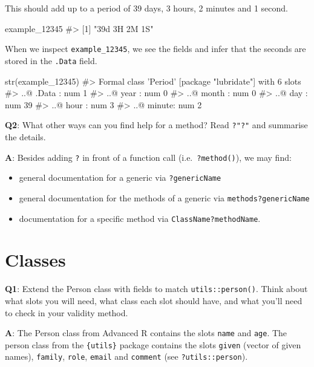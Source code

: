 \documentclass[
]{krantz}
\makeatletter
\newenvironment{Shaded}{\begin{snugshade}}{\end{snugshade}}
\newcommand{\CommentTok}[1]{\textcolor[rgb]{0.56,0.35,0.01}{\textit{#1}}}
\newcommand{\DecValTok}[1]{\textcolor[rgb]{0.00,0.00,0.81}{#1}}
\newcommand{\KeywordTok}[1]{\textcolor[rgb]{0.13,0.29,0.53}{\textbf{#1}}}
\newcommand{\NormalTok}[1]{#1}
\providecommand{\tightlist}{%
  \setlength{\itemsep}{0pt}\setlength{\parskip}{0pt}}
\newenvironment{kframe}{%
\medskip{}
\setlength{\fboxsep}{.8em}
 \def\at@end@of@kframe{}%
 \ifinner\ifhmode%
  \def\at@end@of@kframe{\end{minipage}}%
  \begin{minipage}{\columnwidth}%
 \fi\fi%
 \def\FrameCommand##1{\hskip\@totalleftmargin \hskip-\fboxsep
 \colorbox{shadecolor}{##1}\hskip-\fboxsep
     \hskip-\linewidth \hskip-\@totalleftmargin \hskip\columnwidth}%
 \MakeFramed {\advance\hsize-\width
   \@totalleftmargin\z@ \linewidth\hsize
   \@setminipage}}%
 {\par\unskip\endMakeFramed%
 \at@end@of@kframe}
\renewenvironment{Shaded}{\begin{kframe}}{\end{kframe}}
\renewcommand{\KeywordTok} [1]{\textcolor[rgb]{0.00,0.44,0.13}{{#1}}}
\renewcommand{\DecValTok}  [1]{\textcolor[rgb]{0.25,0.63,0.44}{{#1}}}
\renewcommand{\CommentTok} [1]{\textcolor[rgb]{0.38,0.63,0.69}{{#1}}}
\renewcommand{\NormalTok}  [1]{{#1}}
\makeatother
\begin{document}
This should add up to a period of 39 days, 3 hours, 2 minutes and 1 second.

\begin{Shaded}
\begin{Highlighting}[]
\NormalTok{example_}\DecValTok{12345}
\CommentTok{#> [1] "39d 3H 2M 1S"}
\end{Highlighting}
\end{Shaded}

When we inspect \texttt{example\_12345}, we see the fields and infer that the seconds are stored in the \texttt{.Data} field.

\begin{Shaded}
\begin{Highlighting}[]
\KeywordTok{str}\NormalTok{(example_}\DecValTok{12345}\NormalTok{)}
\CommentTok{#> Formal class 'Period' [package "lubridate"] with 6 slots}
\CommentTok{#>   ..@ .Data : num 1}
\CommentTok{#>   ..@ year  : num 0}
\CommentTok{#>   ..@ month : num 0}
\CommentTok{#>   ..@ day   : num 39}
\CommentTok{#>   ..@ hour  : num 3}
\CommentTok{#>   ..@ minute: num 2}
\end{Highlighting}
\end{Shaded}

\textbf{{Q2}}: What other ways can you find help for a method? Read \texttt{?"?"} and summarise the details.

\textbf{{A}}: Besides adding \texttt{?} in front of a function call (i.e.~\texttt{?method()}), we may find:

\begin{itemize}
\tightlist
\item
  general documentation for a generic via \texttt{?genericName}
\item
  general documentation for the methods of a generic via \texttt{methods?genericName}
\item
  documentation for a specific method via \texttt{ClassName?methodName}.
\end{itemize}

\hypertarget{classes-1}{%
\section{Classes}\label{classes-1}}

\textbf{{Q1}}: Extend the Person class with fields to match \texttt{utils::person()}. Think about what slots you will need, what class each slot should have, and what you'll need to check in your validity method.

\textbf{{A}}: The Person class from Advanced R contains the slots \texttt{name} and \texttt{age}. The person class from the \texttt{\{utils\}} package contains the slots \texttt{given} (vector of given names), \texttt{family}, \texttt{role}, \texttt{email} and \texttt{comment} (see \texttt{?utils::person}).
\end{document}
